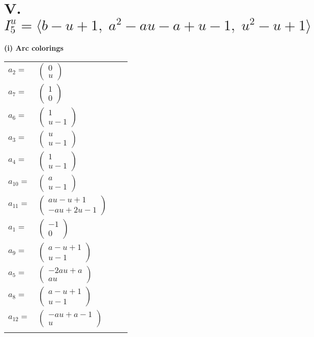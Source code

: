 \documentclass[1p]{elsarticle_modified}
\theoremstyle{definition}
\begin{document}
\centering \section*{V. $I^u_{5}= \langle b- u+1,\;a^2- a u- a+u-1,\;u^2- u+1 \rangle$}
\flushleft \textbf{(i) Arc colorings}\\
\begin{tabular}{m{7pt} m{180pt} m{7pt} m{180pt} }
\flushright $a_{2}=$&$\begin{pmatrix}0\\u\end{pmatrix}$ \\
\flushright $a_{7}=$&$\begin{pmatrix}1\\0\end{pmatrix}$ \\
\flushright $a_{6}=$&$\begin{pmatrix}1\\u-1\end{pmatrix}$ \\
\flushright $a_{3}=$&$\begin{pmatrix}u\\u-1\end{pmatrix}$ \\
\flushright $a_{4}=$&$\begin{pmatrix}1\\u-1\end{pmatrix}$ \\
\flushright $a_{10}=$&$\begin{pmatrix}a\\u-1\end{pmatrix}$ \\
\flushright $a_{11}=$&$\begin{pmatrix}a u- u+1\\- a u+2 u-1\end{pmatrix}$ \\
\flushright $a_{1}=$&$\begin{pmatrix}-1\\0\end{pmatrix}$ \\
\flushright $a_{9}=$&$\begin{pmatrix}a- u+1\\u-1\end{pmatrix}$ \\
\flushright $a_{5}=$&$\begin{pmatrix}-2 a u+a\\a u\end{pmatrix}$ \\
\flushright $a_{8}=$&$\begin{pmatrix}a- u+1\\u-1\end{pmatrix}$ \\
\flushright $a_{12}=$&$\begin{pmatrix}- a u+a-1\\u\end{pmatrix}$\\&\end{tabular}
\end{document}
